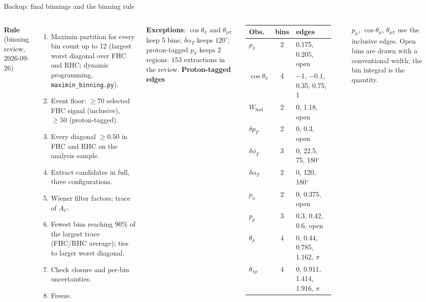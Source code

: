 \documentclass[aspectratio=169,10pt]{beamer}
\begin{document}
\begin{frame}{Backup: final binnings and the binning rule}
  \begin{columns}[T]
  \scriptsize
  \textbf{Rule} (binning review, 2026-09-26)
  \begin{enumerate}\setlength\itemsep{0pt}
    \item Maximin partition for every bin count up to 12 (largest worst diagonal over FHC and RHC; dynamic programming, \texttt{maximin\_binning.py}).
    \item Event floor: $\ge70$ selected FHC signal (inclusive), $\ge50$ (proton-tagged).
    \item Every diagonal $\ge0.50$ in FHC and RHC on the analysis sample.
    \item Extract candidates in full, three configurations.
    \item Wiener filter factors; trace of $A_C$.
    \item Fewest bins reaching $90\%$ of the largest trace (FHC/RHC average); ties to larger worst diagonal.
    \item Check closure and per-bin uncertainties.
    \item Freeze.
  \end{enumerate}
  \textbf{Exceptions}: $\cos\theta_\pi$ and $\theta_{\mu\pi}$ keep 5 bins; $\delta\alpha_T$ keeps $120^\circ$;
  proton-tagged $p_\pi$ keeps 2 regions. $153$ extractions in the review.
  \scriptsize\centering\setlength{\tabcolsep}{2pt}
  \textbf{Proton-tagged edges}\\[1mm]
  \begin{tabular}{lcl}
    \toprule
    Obs. & bins & edges \\\midrule
    $p_\pi$ & 2 & 0.175, 0.205, open \\
    $\cos\theta_\pi$ & 4 & $-1$, $-0.1$, 0.35, 0.75, 1 \\
    $W_\mathrm{had}$ & 2 & 0, 1.18, open \\
    $\delta p_T$ & 2 & 0, 0.3, open \\
    $\delta\phi_T$ & 3 & 0, 22.5, 75, 180$^\circ$ \\
    $\delta\alpha_T$ & 2 & 0, 120, 180$^\circ$ \\
    $p_n$ & 2 & 0, 0.375, open \\
    $p_p$ & 3 & 0.3, 0.42, 0.6, open \\
    $\theta_p$ & 4 & 0, 0.44, 0.785, 1.162, $\pi$ \\
    $\theta_{\pi p}$ & 4 & 0, 0.911, 1.414, 1.916, $\pi$ \\
    \bottomrule
  \end{tabular}\\[1mm]
  \raggedright $p_\mu$, $\cos\theta_\mu$, $\theta_{\mu\pi}$ use the inclusive edges. Open bins are drawn with
  a conventional width; the bin integral is the quantity.
  \end{columns}
\end{frame}
\end{document}
